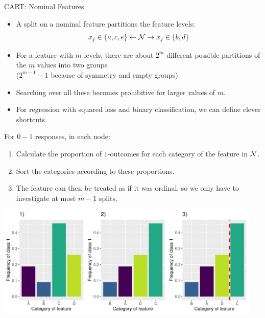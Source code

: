 \begin{vbframe}{CART: Nominal Features}
  \begin{itemize}
  \item A split on a nominal feature partitions the feature levels:
    $$x_j \in \{a,c,e\} \leftarrow \mathcal{N} \rightarrow x_j \in \{b,d\} $$
  \item For a feature with $m$ levels,
  there are about $2^m$ different possible partitions of the $m$ values into two groups\\ ($2^{m-1} - 1$ because of symmetry and empty groups).
  \item Searching over all these becomes prohibitive for larger values of $m$.
  \item For regression with squared loss and binary classification, we can define clever shortcuts.
  \end{itemize}

  \framebreak

For $0-1$ responses, in each node:
  \begin{enumerate}
  \item Calculate the proportion of $1$-outcomes for each category of the feature in $\mathcal{N}$.
  \item Sort the categories according to these proportions.
  \item The feature can then be treated as if it was ordinal, so we only have to investigate at most $m-1$ splits.
  \end{enumerate}

  \vspace{0.3cm}

\begin{knitrout}\scriptsize
{}\color{fgcolor}

{\centering \includegraphics[width=0.95\textwidth]{figure/cart_splitcomp_3} 

}



\end{knitrout}


\end{vbframe}

